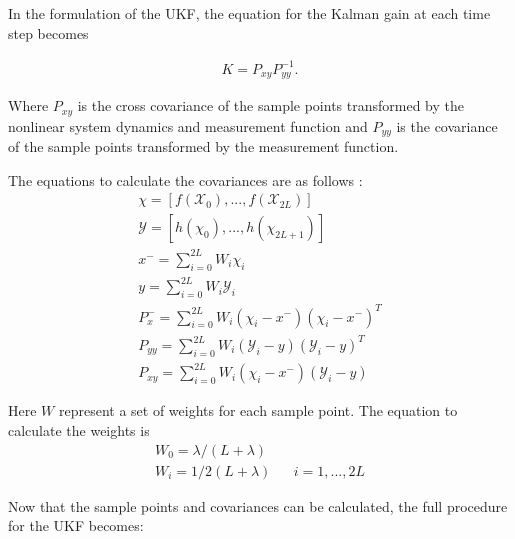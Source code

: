 In the formulation of the UKF, the equation for the Kalman gain at each time step becomes \cite{ukf_merwe}

\begin{align}
K = P_{xy}P^{-1}_{yy}.
\end{align}

Where $P_{xy}$ is the cross covariance of the sample points transformed by the nonlinear system dynamics and measurement function and $P_{yy}$ is the covariance of the sample points transformed by the measurement function.

The equations to calculate the covariances are as follows \cite{ukf_merwe}:
\begin{align}
\chi = [f(\mathcal{X}_0),...,f(\mathcal{X}_{2L})]\\
\mathcal{Y} = [h(\chi_0),...,h(\chi_{2L+1})]\\
x^- = \sum_{i=0}^{2L}W_i\chi_i\\
y = \sum_{i=0}^{2L}W_i\mathcal{Y}_i\\
P^-_x = \sum_{i=0}^{2L}W_i(\chi_i - x^-)(\chi_i - x^-)^T\\
P_{yy} = \sum_{i=0}^{2L}W_i(\mathcal{Y}_i - y)(\mathcal{Y}_i - y)^T \\
P_{xy} = \sum_{i=0}^{2L}W_i(\chi_i - x^-)(\mathcal{Y}_i - y)
\end{align}

Here $W$ represent a set of weights for each sample point. The equation to calculate the weights is \cite{ukf_merwe}
\begin{align}
W_0 = \lambda/(L + \lambda) \\
W_i = 1/2(L + \lambda) && i = 1,...,2L
\end{align}

Now that the sample points and covariances can be calculated, the full procedure for the UKF becomes:

